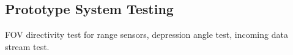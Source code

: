 \subsection{Prototype System Testing}

\noindent FOV directivity test for range sensors, depression angle test, incoming data stream test.\\




